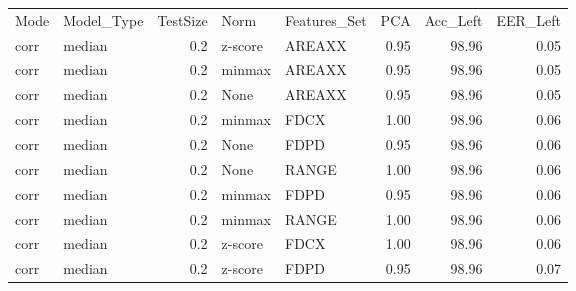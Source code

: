 \begin{tabular}{llrllrrr}
\toprule
Mode & Model\_Type &  TestSize &    Norm & Features\_Set &  PCA &  Acc\_Left &  EER\_Left \\
corr &     median &       0.2 & z-score &       AREAXX & 0.95 &     98.96 &      0.05 \\
\midrule
corr &     median &       0.2 &  minmax &       AREAXX & 0.95 &     98.96 &      0.05 \\
corr &     median &       0.2 &    None &       AREAXX & 0.95 &     98.96 &      0.05 \\
corr &     median &       0.2 &  minmax &         FDCX & 1.00 &     98.96 &      0.06 \\
corr &     median &       0.2 &    None &         FDPD & 0.95 &     98.96 &      0.06 \\
corr &     median &       0.2 &    None &        RANGE & 1.00 &     98.96 &      0.06 \\
corr &     median &       0.2 &  minmax &         FDPD & 0.95 &     98.96 &      0.06 \\
corr &     median &       0.2 &  minmax &        RANGE & 1.00 &     98.96 &      0.06 \\
corr &     median &       0.2 & z-score &         FDCX & 1.00 &     98.96 &      0.06 \\
corr &     median &       0.2 & z-score &         FDPD & 0.95 &     98.96 &      0.07 \\
\bottomrule
\end{tabular}
